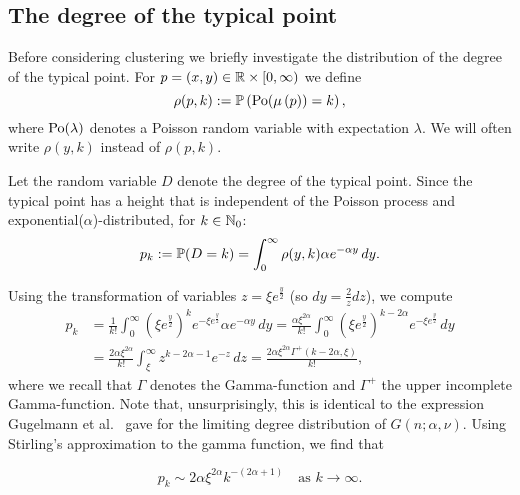 \subsection{The degree of the typical point\label{ssec:degrees_infinite_model}}

Before considering clustering we briefly investigate the distribution of the degree of the typical point. 
For $p = (x,y) \in {\mathbb R}\times[0,\infty)$ we define
\begin{equation}\label{eq:def_degree_inf_model}
	\rho(p,k) := \mathbb{P}\left({\mathrm{Po}}(\mu\left(p\right)) = k\right),
\end{equation}
where ${\mathrm{Po}}(\lambda)$ denotes a Poisson random variable with expectation $\lambda$. We will often write $\rho(y,k)$ instead of $\rho(p,k)$.

Let the random variable $D$ denote the degree of the typical point. Since the typical point has a height that is independent of the Poisson process and exponential($\alpha$)-distributed, for $k \in \mathbb{N}_0$:
\begin{equation}\label{eq:def_pk}
	p_k := \mathbb{P}( D=k ) = \int_0^\infty \rho(y,k) \alpha e^{-\alpha y} \, dy.
\end{equation}

Using the transformation of variables $z = \xi e^{\frac{y}{2}}$ (so $dy = \frac{2}{z}dz$), we compute
\begin{align*}
	p_k
    &= \frac{1}{k!} \int_0^\infty \left(\xi e^{\frac{y}{2}}\right)^k 
    	e^{-\xi e^{\frac{y}{2}}} \alpha e^{-\alpha y} \, dy
    	= \frac{\alpha \xi^{2\alpha}}{k!} \int_0^\infty 
    	\left(\xi e^{\frac{y}{2}}\right)^{k - 2\alpha} e^{-\xi e^{\frac{y}{2}}}
        \, dy\\
    &= \frac{2\alpha \xi^{2\alpha}}{k!} \int_{\xi}^{\infty} 
    	z^{k -2\alpha-1} e^{-z} \, dz
    	= \frac{2\alpha \xi^{2\alpha}\Gamma^+(k - 2\alpha, \xi)}{k!},
\end{align*}
where we recall that $\Gamma$ denotes the Gamma-function and $\Gamma^{+}$ the upper incomplete Gamma-function.
Note that, unsurprisingly, this is identical to the expression Gugelmann et al.~\cite{gugelmann2012random} gave for the limiting degree distribution of $G(n;\alpha,\nu)$. Using Stirling's approximation to the gamma function, we find that 

\begin{equation}\label{eq:degree_distribution_P_asymptotics}
	p_k \sim 2\alpha\xi^{2\alpha} k^{-(2\alpha + 1)}
	\quad \text{as } k \to \infty.
\end{equation}

